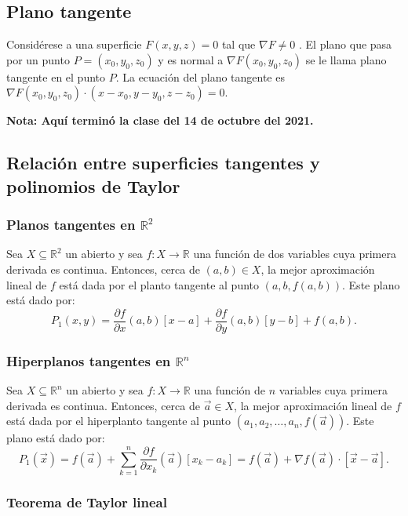 \documentclass{article}
\begin{document}
\subsection*{Plano tangente}

Considérese a una superficie $F(x,y,z)=0$ tal que $\nabla F\neq 0$	. El plano que pasa por un punto $P=(x_0,y_0,z_0)$ y es normal a $\nabla F(x_0,y_0,z_0)$ se le llama plano tangente en el punto $P$. La ecuación del plano tangente es $\nabla F(x_0,y_0,z_0)\cdot (x-x_0,y-y_0,z-z_0)=0$.

\vspace{10pt}
\textbf{Nota: Aquí terminó la clase del 14 de octubre del 2021.}

\subsection*{Relación entre superficies tangentes y polinomios de Taylor}

\subsubsection*{Planos tangentes en $\mathbb{R}^2$}

Sea $X\subseteq\mathbb{R}^2$ un abierto y sea $f:X\to\mathbb{R}$ una función de dos variables cuya primera derivada es continua. Entonces, cerca de $(a,b)\in X$, la mejor aproximación lineal de $f$ está dada por el planto tangente al punto $(a,b,f(a,b))$. Este plano está dado por:
$$P_1(x,y)=\frac{\partial f}{\partial x}(a,b)[x-a]+\frac{\partial f}{\partial y}(a,b)[y-b]+f(a,b).$$

\subsubsection*{Hiperplanos tangentes en $\mathbb{R}^n$}

Sea $X\subseteq\mathbb{R}^n$ un abierto y sea $f:X\to\mathbb{R}$ una función de $n$ variables cuya primera derivada es continua. Entonces, cerca de $\vec{a}\in X$, la mejor aproximación lineal de $f$ está dada por el hiperplanto tangente al punto $(a_1,a_2,\ldots,a_n,f(\vec{a}))$. Este plano está dado por:
$$P_1(\vec{x})=f(\vec{a})+\sum_{k=1}^n \frac{\partial f}{\partial x_k}(\vec{a})[x_k-a_k]=f(\vec{a})+\nabla f(\vec{a})\cdot[\vec{x}-\vec{a}].$$

\subsubsection*{Teorema de Taylor lineal}
\end{document}
